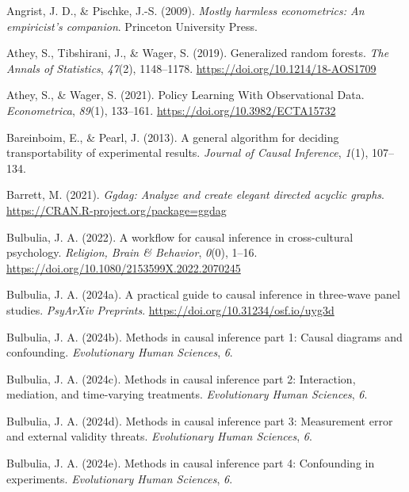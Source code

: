 \documentclass[
  single column]{article}
\newlength{\cslhangindent}
\newenvironment{CSLReferences}[2] %
 {\begin{list}{}{%
  \setlength{\itemindent}{0pt}
  \setlength{\leftmargin}{0pt}
  \setlength{\parsep}{0pt}
  \ifodd #1
   \setlength{\leftmargin}{\cslhangindent}
   \setlength{\itemindent}{-1\cslhangindent}
  \fi
  \setlength{\itemsep}{#2\baselineskip}}}
 {\end{list}}
\begin{document}
\label{refs}
\begin{CSLReferences}{1}{0}
Angrist, J. D., \& Pischke, J.-S. (2009). \emph{Mostly harmless
econometrics: An empiricist's companion}. Princeton University Press.

Athey, S., Tibshirani, J., \& Wager, S. (2019). Generalized random
forests. \emph{The Annals of Statistics}, \emph{47}(2), 1148--1178.
\url{https://doi.org/10.1214/18-AOS1709}

Athey, S., \& Wager, S. (2021). Policy Learning With Observational Data.
\emph{Econometrica}, \emph{89}(1), 133--161.
\url{https://doi.org/10.3982/ECTA15732}

Bareinboim, E., \& Pearl, J. (2013). A general algorithm for deciding
transportability of experimental results. \emph{Journal of Causal
Inference}, \emph{1}(1), 107--134.

Barrett, M. (2021). \emph{Ggdag: Analyze and create elegant directed
acyclic graphs}. \url{https://CRAN.R-project.org/package=ggdag}

Bulbulia, J. A. (2022). A workflow for causal inference in
cross-cultural psychology. \emph{Religion, Brain \& Behavior},
\emph{0}(0), 1--16. \url{https://doi.org/10.1080/2153599X.2022.2070245}

Bulbulia, J. A. (2024a). A practical guide to causal inference in
three-wave panel studies. \emph{PsyArXiv Preprints}.
\url{https://doi.org/10.31234/osf.io/uyg3d}

Bulbulia, J. A. (2024b). Methods in causal inference part 1: Causal
diagrams and confounding. \emph{Evolutionary Human Sciences}, \emph{6}.

Bulbulia, J. A. (2024c). Methods in causal inference part 2:
Interaction, mediation, and time-varying treatments. \emph{Evolutionary
Human Sciences}, \emph{6}.

Bulbulia, J. A. (2024d). Methods in causal inference part 3: Measurement
error and external validity threats. \emph{Evolutionary Human Sciences},
\emph{6}.

Bulbulia, J. A. (2024e). Methods in causal inference part 4: Confounding
in experiments. \emph{Evolutionary Human Sciences}, \emph{6}.


\end{CSLReferences}
\end{document}

